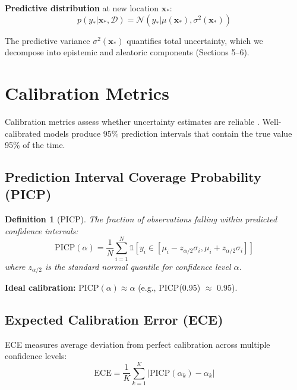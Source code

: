 \documentclass[11pt,letterpaper]{article}
\newtheorem{definition}{Definition}
\newcommand{\bx}{\mathbf{x}}
\newcommand{\Normal}{\mathcal{N}}
\begin{document}
\textbf{Predictive distribution} at new location $\bx_*$:
\begin{equation}
p(y_* | \bx_*, \mathcal{D}) = \Normal(y_* | \mu(\bx_*), \sigma^2(\bx_*))
\label{eq:predictive}
\end{equation}

The predictive variance $\sigma^2(\bx_*)$ quantifies total uncertainty, which we decompose into epistemic and aleatoric components (Sections 5--6).

\section{Calibration Metrics} \label{sec:metrics}

Calibration metrics assess whether uncertainty estimates are reliable \citep{gneiting2007strictly}. Well-calibrated models produce 95\% prediction intervals that contain the true value 95\% of the time.

\subsection{Prediction Interval Coverage Probability (PICP)}

\begin{definition}[PICP]
The fraction of observations falling within predicted confidence intervals:
\begin{equation}
\text{PICP}(\alpha) = \frac{1}{N} \sum_{i=1}^{N} \mathbb{1}\left[ y_i \in [\mu_i - z_{\alpha/2}\sigma_i, \mu_i + z_{\alpha/2}\sigma_i] \right]
\label{eq:picp}
\end{equation}
where $z_{\alpha/2}$ is the standard normal quantile for confidence level $\alpha$.
\end{definition}

\textbf{Ideal calibration:} $\text{PICP}(\alpha) \approx \alpha$ (e.g., PICP(0.95) $\approx$ 0.95).

\subsection{Expected Calibration Error (ECE)}

ECE measures average deviation from perfect calibration across multiple confidence levels:
\begin{equation}
\text{ECE} = \frac{1}{K} \sum_{k=1}^{K} \left| \text{PICP}(\alpha_k) - \alpha_k \right|
\label{eq:ece}
\end{equation}
\end{document}
